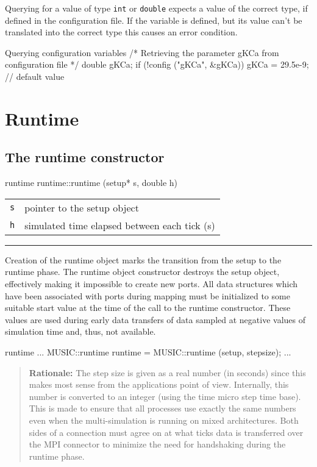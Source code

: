 \documentclass[a4paper,twoside]{report}
\makeatletter
\newenvironment{rationale}%
{\par\begin{quote}\textbf{Rationale:}}%
{\par\end{quote}}
\newenvironment{parameters}%
{\begin{tabular}{@{\hspace{2em}}lp{0.6\textwidth}}}%
{\end{tabular}\par\vspace{1mm}\par\hrule\par\vspace{5mm}}
\makeatother
\begin{document}
Querying for a value of type \lstinline|int| or \lstinline|double|
expects a value of the correct type, if defined in the configuration
file.  If the variable is defined, but its value can't be translated
into the correct type this causes an error condition.

\begin{code}{Querying configuration variables}
/* Retrieving the parameter gKCa
   from configuration file */
double gKCa;
if (!config ("gKCa", &gKCa))
  gKCa = 29.5e-9; // default value
\end{code}

\section{Runtime}

\subsection{The runtime constructor}

\begin{head}{runtime}
  runtime::runtime (setup* s, double h)
\end{head}
\begin{parameters}
  \lstinline|s| & pointer to the setup object \\
  \lstinline|h| & simulated time elapsed between each tick (s) \\
\end{parameters}

Creation of the runtime object marks the transition from the setup to
the runtime phase.  The runtime object constructor destroys the setup
object, effectively making it impossible to create new ports.  All
data structures which have been associated with ports during mapping
must be initialized to some suitable start value at the time of the
call to the runtime constructor.  These values are used during early
data transfers of data sampled at negative values of simulation time
and, thus, not available.

\begin{code}{runtime}
  ...
  MUSIC::runtime runtime = MUSIC::runtime (setup, stepsize);
  ...
\end{code}

\begin{rationale}
  The step size is given as a real number (in seconds) since this
  makes most sense from the applications point of view.  Internally,
  this number is converted to an integer (using the time micro step
  time base).  This is made to ensure that all processes use exactly
  the same numbers even when the multi-simulation is running on mixed
  architectures.  Both sides of a connection must agree on at what
  ticks data is transferred over the MPI connector to minimize the
  need for handshaking during the runtime phase.
\end{rationale}
\end{document}
